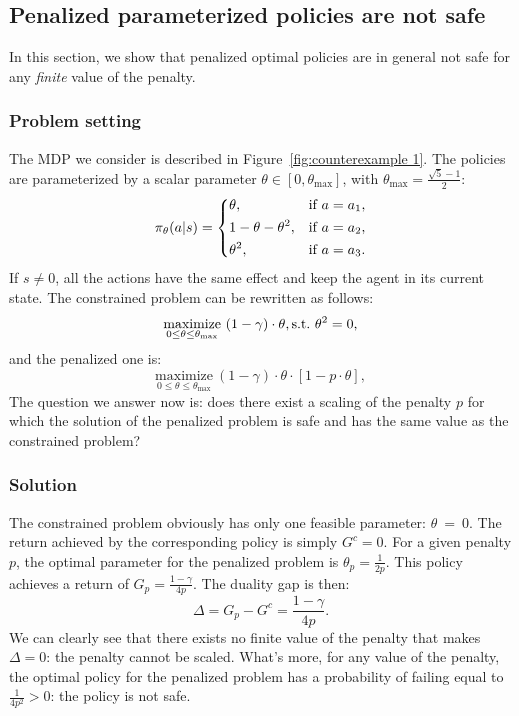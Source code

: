 \subsection{Penalized parameterized policies are not safe} \label{sec:unsafe parameterized}
In this section, we show that penalized optimal policies are in general not safe for any\emph{ finite} value of the penalty.

\subsubsection{Problem setting} The MDP we consider is described in Figure~\ref{fig:counterexample 1}. The policies are parameterized by a scalar parameter $\theta\in[0,\theta_{\text{max}}]$, with $\theta_\text{max} = \frac{\sqrt{5}-1}{2}$:
$$
	\pi_\theta(a|s) = \begin{dcases}
		\theta,&\text{if}~a=a_1,\\
		1 - \theta - \theta^2,&\text{if}~a=a_2,\\
		\theta^2,&\text{if}~a=a_3.\\
	\end{dcases}
$$
If $s\neq0$, all the actions have the same effect and keep the agent in its current state. The constrained problem can be rewritten as follows:
\begin{equation*}
	\underset{0\leq\theta\leq\theta_\text{max}}{\text{maximize}}~(1-\gamma)\cdot\theta,\\
	\text{s.t.} ~\theta^2 = 0,
\end{equation*}
and the penalized one is:
\begin{equation*}
	\underset{0\leq\theta\leq\theta_\text{max}}{\text{maximize}}~(1-\gamma)\cdot\theta\cdot\left[1 - p\cdot\theta\right],
\end{equation*}
The question we answer now is: does there exist a scaling of the penalty $p$ for which the solution of the penalized problem is safe and has the same value as the constrained problem?

\subsubsection{Solution} The constrained problem obviously has only one feasible parameter: $\theta~=~0$. The return achieved by the corresponding policy is simply $G^c = 0$. For a given penalty $p$, the optimal parameter for the penalized problem is $\theta_p = \frac{1}{2p}$. This policy achieves a return of $G_p = \frac{1-\gamma}{4p}$. The duality gap is then:
$$
	\Delta = G_p - G^c = \frac{1-\gamma}{4p}.
$$
We can clearly see that there exists no finite value of the penalty that makes $\Delta = 0$: the penalty cannot be scaled. What's more, for any value of the penalty, the optimal policy for the penalized problem has a probability of failing equal to $\frac{1}{4p^2}>0$: the policy is not safe.

